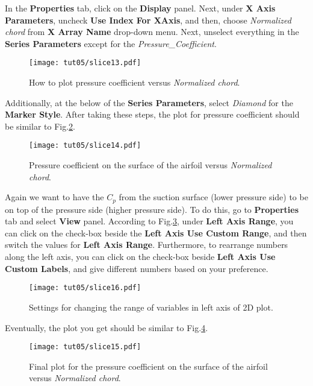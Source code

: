 In the \textbf{Properties} tab, click on the \textbf{Display} panel. Next, under \textbf{X Axis Parameters}, uncheck \textbf{Use Index For XAxis}, and then, choose \textit{Normalized chord} from \textbf{X Array Name} drop-down menu. Next, unselect everything in the \textbf{Series Parameters} except for the \textit{Pressure\_Coefficient}. 
\begin{figure}[htbp]
    \centering
    \texttt{[image: tut05/slice13.pdf]}
    \caption{How to plot pressure coefficient versus \textit{Normalized chord}.}
    \label{fig5:slice13}
\end{figure}
Additionally, at the below of the \textbf{Series Parameters}, select \textit{Diamond} for the \textbf{Marker Style}. After taking these steps, the plot for pressure coefficient should be similar to Fig.\ref{fig5:slice14}.
\begin{figure}[htbp]
    \centering
    \texttt{[image: tut05/slice14.pdf]}
    \caption{Pressure coefficient on the surface of the airfoil versus \textit{Normalized chord}.}
    \label{fig5:slice14}
\end{figure}
Again we want to have the $C_p$ from the suction surface (lower pressure side) to be on top of the pressure side (higher pressure side). To do this, go to \textbf{Properties} tab and select \textbf{View} panel. According to Fig.\ref{fig5:slice16}, under \textbf{Left Axis Range}, you can click on the check-box beside the \textbf{Left Axis Use Custom Range}, and then switch the values for \textbf{Left Axis Range}. Furthermore, to rearrange numbers along the left axis, you can click on the check-box beside \textbf{Left Axis Use Custom Labels}, and give different numbers based on your preference.
\begin{figure}[htbp]
    \centering
    \texttt{[image: tut05/slice16.pdf]}
    \caption{Settings for changing the range of variables in left axis of 2D plot.}
    \label{fig5:slice16}
\end{figure}
Eventually, the plot you get should be similar to Fig.\ref{fig5:slice15}.
\begin{figure}[htbp]
    \centering
    \texttt{[image: tut05/slice15.pdf]}
    \caption{Final plot for the pressure coefficient on the surface of the airfoil versus \textit{Normalized chord}.}
    \label{fig5:slice15}
\end{figure}
